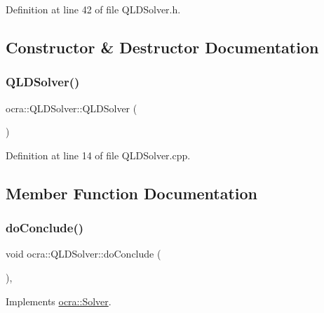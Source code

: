 Definition at line 42 of file Q\+L\+D\+Solver.\+h.



\subsection{Constructor \& Destructor Documentation}
\hypertarget{classocra_1_1QLDSolver_a0071bb356541ccce1b5c5d3672baf72f}{}\label{classocra_1_1QLDSolver_a0071bb356541ccce1b5c5d3672baf72f} 
\subsubsection{\texorpdfstring{Q\+L\+D\+Solver()}{QLDSolver()}}
{\footnotesize\ttfamily ocra\+::\+Q\+L\+D\+Solver\+::\+Q\+L\+D\+Solver (\begin{DoxyParamCaption}{ }\end{DoxyParamCaption})}



Definition at line 14 of file Q\+L\+D\+Solver.\+cpp.



\subsection{Member Function Documentation}
\hypertarget{classocra_1_1QLDSolver_a1d6f5101e1cc2b6bc8256ac2d3e0d710}{}\label{classocra_1_1QLDSolver_a1d6f5101e1cc2b6bc8256ac2d3e0d710} 
\subsubsection{\texorpdfstring{do\+Conclude()}{doConclude()}}
{\footnotesize\ttfamily void ocra\+::\+Q\+L\+D\+Solver\+::do\+Conclude (\begin{DoxyParamCaption}{ }\end{DoxyParamCaption})\hspace{0.3cm}{\ttfamily [protected]}, {\ttfamily [virtual]}}



Implements \hyperlink{classocra_1_1Solver_ac9d2d41d544b57a75e0d03db073d646e}{ocra\+::\+Solver}.



